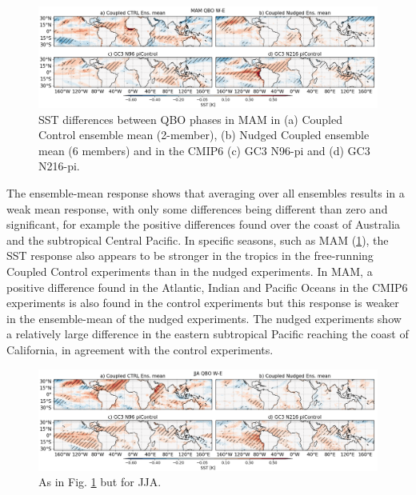 \begin{figure}[t!]
\centering
 \includegraphics[width=\linewidth]{figures/sstseasonal_mamqbowqboe.png}
\caption[SST response in MAM to the QBO in coupled nudged experiments]{ SST differences between QBO phases in MAM in (a) Coupled Control ensemble mean (2-member), (b) Nudged Coupled ensemble mean (6 members) and in the CMIP6 (c) GC3 N96-pi and (d) GC3 N216-pi.}
\label{fig:sst_mam_coupled}
\end{figure}

The ensemble-mean response shows that averaging over all ensembles results in a weak mean response, with only some differences being different than zero and significant, for example the positive differences found over the coast of Australia and the subtropical Central Pacific. 
In specific seasons, such as MAM (\ref{fig:sst_mam_coupled}), the SST response also appears to be stronger in the tropics in the free-running Coupled Control experiments than in the nudged experiments. 
In MAM, a positive difference found in the Atlantic, Indian and Pacific Oceans in the CMIP6 experiments is also found in the control experiments but this response is weaker in the ensemble-mean of the nudged experiments.
The nudged experiments show a relatively large difference in the eastern subtropical Pacific reaching the coast of California, in agreement with the control experiments.

\begin{figure}[t!]
\centering
 \includegraphics[width=\linewidth]{figures/sstseasonal_jjaqbowqboe.png}
\caption[SST response in JJA to the QBO in coupled nudged experiments]{As in Fig. \ref{fig:sst_mam_coupled} but for JJA.}
\label{fig:sst_jja_coupled}
\end{figure}

